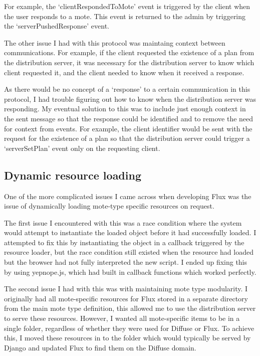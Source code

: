 \documentclass[a4papert,11pt,notitlepage]{ltxdoc}
\begin{document}
For example, the `clientRespondedToMote' event is triggered by the client when the user responds to a mote. This event is returned to the admin by triggering the `serverPushedResponse' event.

The other issue I had with this protocol was maintaing context between communications. For example, if the client requested the existence of a plan from the distribution server, it was necessary for the distribution server to know which client requested it, and the client needed to know when it received a response. 

As there would be no concept of a `response' to a certain communication in this protocol, I had trouble figuring out how to know when the distribution server was responding. My eventual solution to this was to include just enough context in the sent message so that the response could be identified and to remove the need for context from events. For example, the client identifier would be sent with the request for the existence of a plan so that the distribution server could trigger a `serverSetPlan' event only on the requesting client.
 
 \subsection{Dynamic resource loading}
One of the more complicated issues I came across when developing Flux was the issue of dynamically loading mote-type specific resources on request. 

The first issue I encountered with this was a race condition where the system would attempt to instantiate the loaded object before it had successfully loaded. I attempted to fix this by instantiating the object in a callback triggered by the resource loader, but the race condition still existed when the resource had loaded but the browser had not fully interpreted the new script. I ended up fixing this by using yepnope.js, which had built in callback functions which worked perfectly.

The second issue I had with this was with maintaining mote type modularity. I originally had all mote-specific resources for Flux stored in a separate directory from the main mote type definition, this allowed me to use the distribution server to serve these resources. However, I wanted all mote-specific items to be in a single folder, regardless of whether they were used for Diffuse or Flux. To achieve this, I moved these resources in to the folder which would typically be served by Django and updated Flux to find them on the Diffuse domain. 
\end{document}
